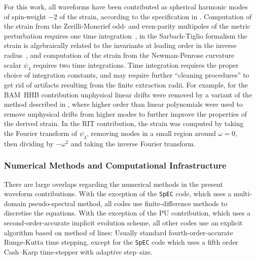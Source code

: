 For this work, all waveforms have been contributed as spherical harmonic
modes of spin-weight $-2$ of the strain, according to the specification
in \cite{Brown:2007jx}.  Computation of the strain from the
Zerilli-Moncrief odd- and even-parity
multipoles of the metric perturbation requires one time
integration~\cite{Nagar:2005ea,Pollney:2007ss}, 
in the Sarbach-Tiglio formalism the strain is algebraically related to 
the invariants at leading order in the inverse 
radius~\cite{Ruiz:2007yx,Nagar:2005ea}, and computation of
the strain from the Newman-Penrose curvature scalar $\psi_4$ requires two
time integrations. Time integration requires the proper choice of integration 
constants, and may require further ``cleaning procedures'' to get rid
of artifacts resulting from the finite extraction radii. For example, for
the BAM~HHB contribution unphysical linear drifts were removed by a
variant of the method described in \cite{Damour:2008te}, where higher
order than linear polynomials were used to remove unphysical drifts from
higher modes to further improve the properties of the derived strain. In
the RIT contribution, the strain was computed by taking the Fourier
transform of $\psi_4$, removing modes in a small region around $\omega =
0$, then dividing by $- \omega^2$ and taking the inverse Fourier
transform.

\subsubsection{Numerical Methods and Computational Infrastructure}
\label{ssec:num}

There are large overlaps regarding the numerical methods in the
present waveform contributions. With the exception of the {\tt SpEC}
code, which uses a multi-domain pseudo-spectral method, all codes use
finite-difference methods to discretise the equations. With the
exception of the PU contribution, which uses a second-order-accurate
implicit evolution scheme, all other codes use an explicit algorithm
based on method of lines: Usually standard fourth-order-accurate
Runge-Kutta time stepping, except for the {\tt SpEC} code which uses a
fifth order Cash--Karp time-stepper with adaptive step--size.

